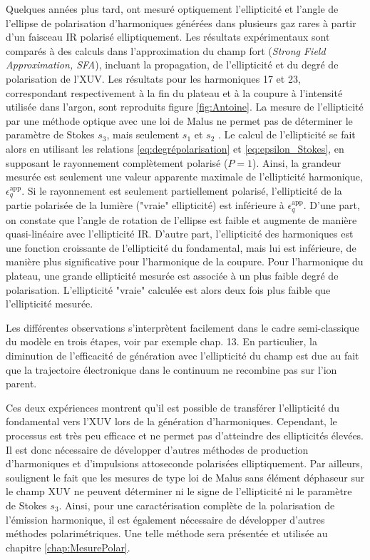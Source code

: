 Quelques années plus tard,  ont mesuré optiquement l'ellipticité et l'angle de l'ellipse de polarisation d'harmoniques générées dans plusieurs gaz rares à partir d'un faisceau IR polarisé elliptiquement. Les résultats expérimentaux sont comparés à des calculs dans l'approximation du champ fort (\textit{Strong Field Approximation, SFA}), incluant la propagation, de l'ellipticité et du degré de polarisation de l'XUV. Les résultats pour les harmoniques 17 et 23, correspondant respectivement à la fin du plateau et à la coupure à l'intensité utilisée dans l'argon, sont reproduits figure \ref{fig:Antoine}. La mesure de l'ellipticité par une méthode optique avec une loi de Malus ne permet pas de déterminer le paramètre de Stokes $s_3$, mais seulement $s_1$ et $s_2$ . Le calcul de l'ellipticité se fait alors en utilisant les relations \ref{eq:degrépolarisation} et \ref{eq:epsilon_Stokes}, en supposant le rayonnement complètement polarisé ($P = 1$). Ainsi, la grandeur mesurée est seulement une valeur apparente maximale de l'ellipticité harmonique, $\epsilon_q^{\text{app}}$. Si le rayonnement est seulement partiellement polarisé, l'ellipticité de la partie polarisée de la lumière ("vraie" ellipticité) est inférieure à $\epsilon_q^{\text{app}}$. D'une part, on constate que l'angle de rotation de l'ellipse est faible et augmente de manière quasi-linéaire avec l'ellipticité IR. D'autre part, l'ellipticité des harmoniques est une fonction croissante de l'ellipticité du fondamental, mais lui est inférieure, de manière plus significative pour l'harmonique de la coupure. Pour l'harmonique du plateau, une grande ellipticité mesurée est associée à un plus faible degré de polarisation. L'ellipticité "vraie" calculée est alors deux fois plus faible que l'ellipticité mesurée.

Les différentes observations s'interprètent facilement dans le cadre semi-classique du modèle en trois étapes, voir par exemple  chap. 13. En particulier, la diminution de l'efficacité de génération avec l'ellipticité du champ est due au fait que la trajectoire électronique dans le continuum ne recombine pas sur l'ion parent.

Ces deux expériences montrent qu'il est possible de transférer l'ellipticité du fondamental vers l'XUV lors de la génération d'harmoniques. Cependant, le processus est très peu efficace et ne permet pas d'atteindre des ellipticités élevées. Il est donc nécessaire de développer d'autres méthodes de production d'harmoniques et d'impulsions attoseconde polarisées elliptiquement. Par ailleurs,  soulignent le fait que les mesures de type loi de Malus sans élément déphaseur sur le champ XUV ne peuvent déterminer ni le signe de l'ellipticité ni le paramètre de Stokes $s_3$. Ainsi, pour une caractérisation complète de la polarisation de l'émission harmonique, il est également nécessaire de développer d'autres méthodes polarimétriques. Une telle méthode sera présentée et utilisée au chapitre \ref{chap:MesurePolar}.


